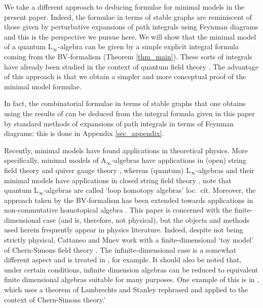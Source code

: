 \documentclass[]{amsart}
\theoremstyle{definition}
\newcommand{\Linf}{L$_\infty$}
\begin{document}
We take a different approach to deducing formulae for minimal models in the present paper. Indeed, the formulae in terms of stable graphs are reminiscent of those given by perturbative expansions of path integrals using Feynman diagrams and this is the perspective we pursue here. We will show that the minimal model of a quantum \Linf-algebra can be given by a simple explicit integral formula coming from the BV-formalism (Theorem \ref{thm_main}). These sorts of integrals have already been studied in the context of quantum field theory \cite{cattaneo_mnev,costello}. The advantage of this approach is that we obtain a simpler and more conceptual proof of the minimal model formulae. 

In fact, the combinatorial formulae in terms of stable graphs that one obtains using the results of \cite{chuang_laz_feynman} can be deduced from the integral formula given in this paper by standard methods of expansions of path integrals in terms of Feynman diagrams: this is done in Appendix \ref{sec_appendix}.

Recently, minimal models have found applications in theoretical physics. More specifically, minimal models of A$_\infty$-algebras have applications in (open) string field theory and quiver gauge theory \cite{aspinwall_fidowski,aspinwall_katz,kajiuara,lazaroiu,tomasiello}, whereas (quantum) \Linf-algebras and their minimal models have applications in closed string field theory \cite{meunster_sachs_quantum_open-closed,muenster_sachs_homotopy_classification}, note that quantum \Linf-algebras are called `loop homotopy algebras' loc.~cit. Moreover, the approach taken by the BV-formalism has been extended towards applications in non-commutative homotopical algebra \cite{barannikov_matrix_de_rham,barannikov_noncom_BV,barannikov_solving_nocom_BV,hamilton_classes_on_compactifications,hamilton_noncomm_geo_and_compactifications}. This paper is concerned with the finite-dimensional case (and is, therefore, not physical), but the objects and methods used herein frequently appear in physics literature. Indeed, despite not being strictly physical, Cattaneo and Mnev work with a finite-dimensional `toy model' of Chern-Simons field theory \cite{cattaneo_mnev}. The infinite-dimensional case is a somewhat different aspect and is treated in \cite{costello}, for example. It should also be noted that, under certain conditions, infinite dimension algebras can be reduced to equivalent finite dimensional algebras suitable for many purposes. One example of this is in \cite[Theorem 8.3]{braun_laz_unimodular}, which uses a theorem of Lambrechts and Stanley \cite{lambrechts_stanley} rephrased and applied to the context of Chern-Simons theory.'
\end{document}
